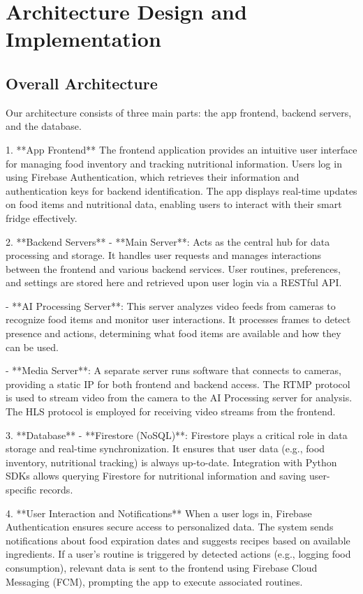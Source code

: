 \documentclass[conference]{IEEEtran}
\begin{document}
\section{Architecture Design and Implementation}
\subsection{Overall Architecture}

Our architecture consists of three main parts: the app frontend, backend servers, and the database.

1. **App Frontend**  
The frontend application provides an intuitive user interface for managing food inventory and tracking nutritional information. Users log in using Firebase Authentication, which retrieves their information and authentication keys for backend identification. The app displays real-time updates on food items and nutritional data, enabling users to interact with their smart fridge effectively.

2. **Backend Servers**  
   - **Main Server**: Acts as the central hub for data processing and storage. It handles user requests and manages interactions between the frontend and various backend services. User routines, preferences, and settings are stored here and retrieved upon user login via a RESTful API.
   
   - **AI Processing Server**: This server analyzes video feeds from cameras to recognize food items and monitor user interactions. It processes frames to detect presence and actions, determining what food items are available and how they can be used.
   
   - **Media Server**: A separate server runs software that connects to cameras, providing a static IP for both frontend and backend access. The RTMP protocol is used to stream video from the camera to the AI Processing server for analysis. The HLS protocol is employed for receiving video streams from the frontend.

3. **Database**  
   - **Firestore (NoSQL)**: Firestore plays a critical role in data storage and real-time synchronization. It ensures that user data (e.g., food inventory, nutritional tracking) is always up-to-date. Integration with Python SDKs allows querying Firestore for nutritional information and saving user-specific records.

4. **User Interaction and Notifications**  
When a user logs in, Firebase Authentication ensures secure access to personalized data. The system sends notifications about food expiration dates and suggests recipes based on available ingredients. If a user’s routine is triggered by detected actions (e.g., logging food consumption), relevant data is sent to the frontend using Firebase Cloud Messaging (FCM), prompting the app to execute associated routines.
\end{document}
